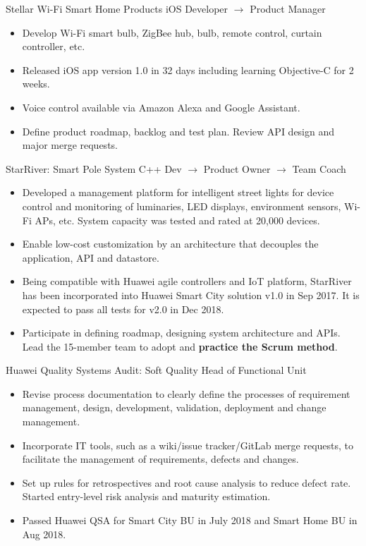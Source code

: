 \documentclass[11pt,a4paper]{moderncv/moderncv}
\begin{document}
{Stellar Wi-Fi Smart Home Products}
{iOS Developer $\rightarrow$ Product Manager}
{}{}
{
\begin{itemize}
	\item Develop Wi-Fi smart bulb, ZigBee hub, bulb, remote control, curtain controller, etc.
	\item Released  iOS app version 1.0 in 32 days including learning Objective-C for 2 weeks.
	\item Voice control available via Amazon Alexa and Google Assistant.
	\item Define product roadmap, backlog and test plan. Review API design and major merge requests.
\end{itemize}
}

{StarRiver: Smart Pole System}
{C++ Dev $\rightarrow$ Product Owner $\rightarrow$ Team Coach}
{}{}
{
\begin{itemize}
	\item Developed a management platform for intelligent street lights for device control and monitoring of luminaries, LED displays, environment sensors, Wi-Fi APs, etc. System capacity was tested and rated at 20,000 devices.
	\item Enable low-cost customization by an architecture that decouples the application, API and datastore.
	\item Being compatible with Huawei agile controllers and IoT platform, StarRiver has been incorporated into Huawei Smart City solution v1.0 in Sep 2017. It is expected to pass all tests for v2.0 in Dec 2018.
	\item Participate in defining roadmap, designing system architecture and APIs. Lead the 15-member team to adopt and \textbf{practice the Scrum method}.
\end{itemize}
}

{Huawei Quality Systems Audit: Soft Quality}
{Head of Functional Unit}
{}{}
{
\begin{itemize}
	\item Revise process documentation to clearly define the processes of requirement management, design, development, validation, deployment and change management.
	\item Incorporate IT tools, such as a wiki/issue tracker/GitLab merge requests, to facilitate the management of requirements, defects and changes.
	\item Set up rules for retrospectives and root cause analysis to reduce defect rate. Started entry-level risk analysis and maturity estimation.
	\item Passed Huawei QSA for Smart City BU in July 2018 and Smart Home BU in Aug 2018.
\end{itemize}
}
\end{document}
